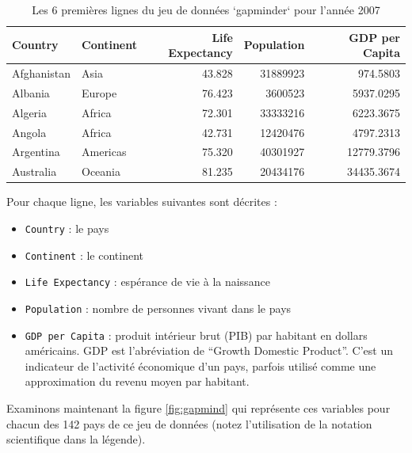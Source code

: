 \documentclass[a4paperpaper,]{article}
\providecommand{\tightlist}{%
  \setlength{\itemsep}{0pt}\setlength{\parskip}{0pt}}
\theoremstyle{definition}
\theoremstyle{definition}
\theoremstyle{definition}
\theoremstyle{remark}
\begin{document}
\begin{table}

\caption{\label{tab:unnamed-chunk-35}Les 6 premières lignes du jeu de données `gapminder` pour l'année 2007}
\centering
\begin{tabular}[t]{l|l|r|r|r}
\hline
Country & Continent & Life Expectancy & Population & GDP per Capita\\
\hline
Afghanistan & Asia & 43.828 & 31889923 & 974.5803\\
\hline
Albania & Europe & 76.423 & 3600523 & 5937.0295\\
\hline
Algeria & Africa & 72.301 & 33333216 & 6223.3675\\
\hline
Angola & Africa & 42.731 & 12420476 & 4797.2313\\
\hline
Argentina & Americas & 75.320 & 40301927 & 12779.3796\\
\hline
Australia & Oceania & 81.235 & 20434176 & 34435.3674\\
\hline
\end{tabular}
\end{table}

Pour chaque ligne, les variables suivantes sont décrites :

\begin{itemize}
\tightlist
\item
  \texttt{Country} : le pays
\item
  \texttt{Continent} : le continent
\item
  \texttt{Life\ Expectancy} : espérance de vie à la naissance
\item
  \texttt{Population} : nombre de personnes vivant dans le pays
\item
  \texttt{GDP\ per\ Capita} : produit intérieur brut (PIB) par habitant
  en dollars américains. GDP est l'abréviation de ``Growth Domestic
  Product''. C'est un indicateur de l'activité économique d'un pays,
  parfois utilisé comme une approximation du revenu moyen par habitant.
\end{itemize}

Examinons maintenant la figure \ref{fig:gapmind} qui représente ces
variables pour chacun des 142 pays de ce jeu de données (notez
l'utilisation de la notation scientifique dans la légende).
\end{document}
